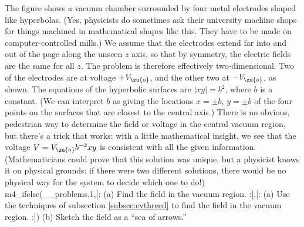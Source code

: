         The figure shows a vacuum chamber surrounded by four metal electrodes shaped
        like hyperbolas. (Yes, physicists do sometimes ask their university machine
        shops for things machined in mathematical shapes like this. They have to be made
        on computer-controlled mills.) We assume that the
        electrodes extend far into and out of the page along the unseen $z$ axis, so
        that by symmetry, the electric fields are the same for all $z$. The problem is
        therefore effectively two-dimensional. Two of the electrodes are at voltage $+V_\zu{o}$,
        and the other two at $-V_\zu{o}$, as shown. The equations of the hyperbolic surfaces
        are $|xy|=b^2$, where $b$ is a constant. (We can interpret $b$ as giving the locations
        $x=\pm b$, $y=\pm b$ of the four points on the surfaces that are closest to the
        central axis.) There is no obvious, pedestrian way to
        determine the field or voltage in the central vacuum region, but there's a trick that
        works: with a little mathematical insight, we see that the voltage $V=V_\zu{o}b^{-2}xy$
        is consistent with all the given information. (Mathematicians could prove that this
        solution was unique, but a physicist knows it on physical grounds: if there were two
        different solutions, there would be no physical way for the system to decide which
        one to do!)\\
m4_ifelse(__problems,1,[:%
(a) Find the field in the vacuum region.\answercheck
:],[:%
(a) Use the techniques of subsection \ref{subsec:evthreed}
        to find the field in the vacuum region.\answercheck
:])
(b) Sketch the field as a ``sea of arrows.''
